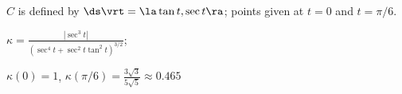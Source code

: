 {$C$ is defined by $\ds \vrt = \la \tan t,\sec t\ra $; points given at $t=0$ and $t=\pi/6$. 
}
{$\kappa = \frac{|\sec^3t|}{\left(\sec^4t+\sec^2t\tan^2t\right)^{3/2}}$;

$\kappa(0) = 1$, $\kappa(\pi/6) = \frac{3\sqrt{3}}{5\sqrt{5}}\approx 0.465$
}
